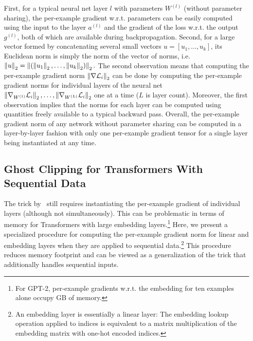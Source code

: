 First, for a typical neural net layer $l$ with parameters $W^{(l)}$ (without parameter sharing), the per-example gradient w.r.t. parameters can be easily computed using the input to the layer $a^{(l)}$ and the gradient of the loss w.r.t. the output $g^{(l)}$, both of which are available during backpropagation. 
Second, for a large vector formed by concatenating several small vectors $u = [u_1, \dots, u_k]$, its Euclidean norm is simply the norm of the vector of norms, i.e. 
$
\left\lVert u \right\rVert_2 =
    \left\lVert ( \left\lVert u_1\right\rVert_2, \dots, \left\lVert u_k\right\rVert_2 ) \right\rVert_2. 
$
The second observation means that computing the per-example gradient norm $\left\lVert\nabla  \mathcal{L}_i\right\rVert_2$ can be done by computing the per-example gradient norms for individual layers of the neural net $\left\lVert\nabla_{W^{(1)}}  \mathcal{L}_i\right\rVert_2, \dots, \left\lVert\nabla_{W^{(L)}}  \mathcal{L}_i\right\rVert_2$ one at a time ($L$ is layer count). 
Moreover, the first observation implies that the norms for each layer can be computed using quantities freely available to a typical backward pass.
Overall, the per-example gradient norm of any network without parameter sharing can be computed in a layer-by-layer fashion with only one per-example gradient tensor for a single layer being instantiated at any time. 




\subsection{Ghost Clipping for Transformers With Sequential Data}\label{sec:our_ghost}
The trick by~\cite{lee2020scaling} still requires instantiating the per-example gradient of individual layers (although not simultaneously). 
This can be problematic in terms of memory for Transformers with large embedding layers.\footnote{
	For GPT-2, per-example gradients w.r.t. the embedding for ten examples alone occupy GB of memory.
} 
Here, we present a specialized procedure for computing the per-example gradient norm for linear and embedding layers when they are applied to sequential data.\footnote{An embedding layer is essentially a linear layer: The embedding lookup operation applied to indices is equivalent to a matrix multiplication of the embedding matrix with one-hot encoded indices.}
This procedure reduces memory footprint and can be viewed as a generalization of the \cite{goodfellow2015efficient} trick that additionally handles sequential inputs. 

